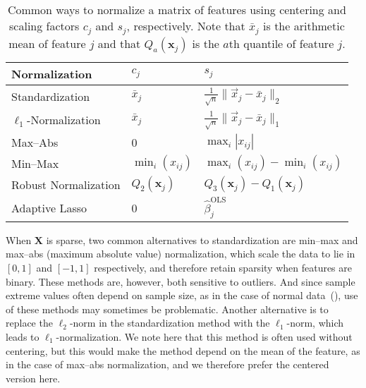 \begin{table}[hbtp]
  \centering
  \caption{
    Common ways to normalize a matrix of features using centering and scaling
    factors \(c_j\) and \(s_j\), respectively. Note that \(\bar{x}_j\) is
    the arithmetic mean of feature \(j\) and that \(Q_a(\bm{x}_j)\) is the
    \(a\)th quantile of feature \(j\).
  }
  \label{tab:normalization-types}
  \begin{tabular}{lll}
    \toprule
    Normalization            & \(c_{j}\)          & \(s_j\)                                                     \\
    \midrule
    Standardization          & \(\bar{x}_j\)      & \(\frac{1}{\sqrt{n}} \lVert \vec{x}_j - \bar{x}_j\rVert_2\) \\
    \addlinespace
    \(\ell_1\)-Normalization & \(\bar{x}_j\)      & \(\frac{1}{\sqrt{n}} \lVert \vec{x}_j - \bar{x}_j\rVert_1\) \\
    \addlinespace
    Max--Abs                 & 0                  & \(\max_i|x_{ij}|\)                                          \\
    \addlinespace
    Min--Max                 & \(\min_i(x_{ij})\) & \(\max_i(x_{ij}) - \min_i(x_{ij})\)                         \\
    \addlinespace
    Robust Normalization     & \(Q_2(\bm{x}_j)\)  & \(Q_3(\bm{x}_j) - Q_1(\bm{x}_j)\)                           \\
    \addlinespace
    Adaptive Lasso           & 0                  & \(\hat{\beta}_j^\text{OLS}\)                                \\
    \bottomrule
  \end{tabular}
\end{table}

When \(\bm{X}\) is sparse, two common alternatives to standardization are min--max and
max--abs (maximum absolute value) normalization, which scale the data to lie in \([0, 1]\)
and \([-1, 1]\) respectively, and therefore retain sparsity when features are binary. These
methods are, however, both sensitive to outliers. And since sample extreme values often
depend on sample size, as in the case of normal data~(), use of
these methods may sometimes be problematic. Another alternative is to replace the
\(\ell_2\)-norm in the standardization method with the \(\ell_1\)-norm, which leads to
\(\ell_1\)-normalization. We note here that this method is often used without centering,
but this would make the method depend on the mean of the feature, as in the case of
max--abs normalization, and we therefore prefer the centered version here.

